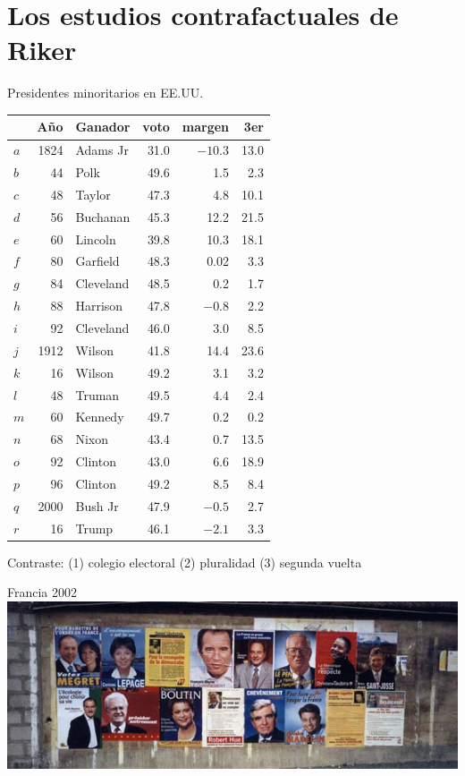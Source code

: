 \documentclass[bigger]{beamer}
\begin{document}
\section{Los estudios contrafactuales de Riker}
\label{sec:orgac961f9}
\begin{frame}[label={sec:org49f4825}]{Presidentes minoritarios en EE.UU.}
\scriptsize \centering
\begin{center}
\begin{tabular}{lrlrrr}
 & Año & Ganador & voto & margen & 3er\\[0pt]
\hline
\(a\) & 1824 & Adams Jr & 31.0 & \(-10.3\) & 13.0\\[0pt]
\(b\) & 44 & Polk & 49.6 & 1.5 & 2.3\\[0pt]
\(c\) & 48 & Taylor & 47.3 & 4.8 & 10.1\\[0pt]
\hline
\(d\) & 56 & Buchanan & 45.3 & 12.2 & 21.5\\[0pt]
\(e\) & 60 & Lincoln & 39.8 & 10.3 & 18.1\\[0pt]
\(f\) & 80 & Garfield & 48.3 & 0.02 & 3.3\\[0pt]
\hline
\(g\) & 84 & Cleveland & 48.5 & 0.2 & 1.7\\[0pt]
\(h\) & 88 & Harrison & 47.8 & \(-0.8\) & 2.2\\[0pt]
\(i\) & 92 & Cleveland & 46.0 & 3.0 & 8.5\\[0pt]
\hline
\(j\) & 1912 & Wilson & 41.8 & 14.4 & 23.6\\[0pt]
\(k\) & 16 & Wilson & 49.2 & 3.1 & 3.2\\[0pt]
\(l\) & 48 & Truman & 49.5 & 4.4 & 2.4\\[0pt]
\hline
\(m\) & 60 & Kennedy & 49.7 & 0.2 & 0.2\\[0pt]
\(n\) & 68 & Nixon & 43.4 & 0.7 & 13.5\\[0pt]
\(o\) & 92 & Clinton & 43.0 & 6.6 & 18.9\\[0pt]
\hline
\(p\) & 96 & Clinton & 49.2 & 8.5 & 8.4\\[0pt]
\(q\) & 2000 & Bush Jr & 47.9 & \(-0.5\) & 2.7\\[0pt]
\(r\) & 16 & Trump & 46.1 & \(-2.1\) & 3.3\\[0pt]
\end{tabular}
\end{center}
Contraste: (1) colegio electoral (2) pluralidad (3) segunda vuelta
\end{frame}
\begin{frame}[label={sec:org04aeec7}]{Francia 2002}
\centering   
\includegraphics[width=\textwidth]{./pics/Affiches-premier-tour2002.jpg}
\end{frame}
\end{document}

